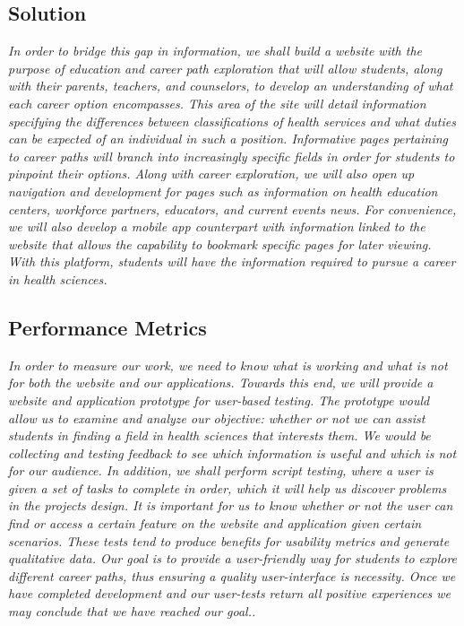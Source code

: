 \documentclass[twoside,letterpaper]{article}
\begin{document}
{\subsection[Solution]{\rmfamily\bfseries\color{black}
Solution}
{\itshape\color{black}
In order to bridge this gap in information, we shall build a website with the purpose of education and career path exploration that will allow students, along with their parents, teachers, and counselors, to develop an understanding of what each career option encompasses. This area of the site will detail information specifying the differences between classifications of health services and what duties can be expected of an individual in such a position. Informative pages pertaining to career paths will branch into increasingly specific fields in order for students to pinpoint their options. Along with career exploration, we will also open up navigation and development for pages such as information on health education centers, workforce partners, educators, and current events news. For convenience, we will also develop a mobile app counterpart with information linked to the website that allows the capability to bookmark specific pages for later viewing. With this platform, students will have the information required to pursue a career in health sciences.}

\subsection[Performance Metrics]{\rmfamily\bfseries\color{black}
Performance Metrics}
{\itshape\color{black}
In order to measure our work, we need to know what is working and what is not for both the website and our applications. Towards this end, we will provide a website and application prototype for user-based testing. The prototype would allow us to examine and analyze our objective: whether or not we can assist students in finding a field in health sciences that interests them. We would be collecting and testing feedback to see which information is useful and which is not for our audience. In addition, we shall perform script testing, where a user is given a set of tasks to complete in order, which it will help us discover problems in the projects design. It is important for us to know whether or not the user can find or access a certain feature on the website and application given certain scenarios. These tests tend to produce benefits for usability metrics and generate qualitative data. Our goal is to provide a user-friendly way for students to explore different career paths, thus ensuring a quality user-interface is necessity. Once we have completed development and our user-tests return all positive experiences we may conclude that we have reached our goal..}

}
\end{document}
